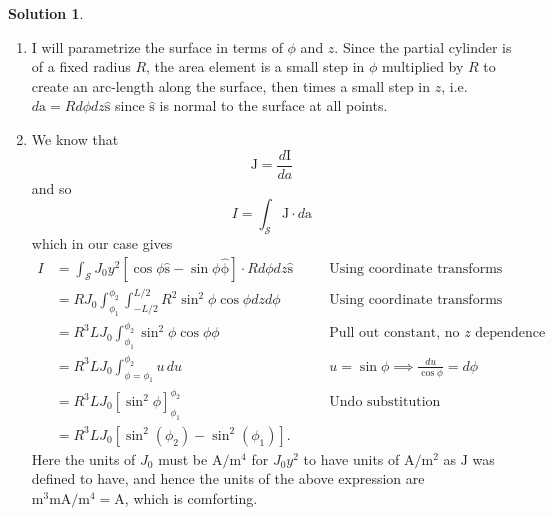 \documentclass[10pt]{article}
\theoremstyle{definition}
\newtheorem{soln}{Solution}
\newcommand{\uv}[1]{\hat{\bv{{#1}}}}
\newcommand{\justif}[2]{&{#1}&\text{#2}}
\newcommand{\bv}[1]{\bm{\mathrm{#1}}}
\begin{document}
\begin{soln}
\begin{enumerate}[label=(\alph*)]
\begin{center}
          \end{center}
    \item I will parametrize the surface in terms of $\phi$ and $z$. Since the partial cylinder is of a fixed radius $R$, the area element is a small step in $\phi$ multiplied by $R$
          to create an arc-length along the surface, then
          times a small step in $z$, i.e. $d\bv{a}=Rd\phi dz\uv{s}$ since $\uv{s}$ is normal to the surface at all points.
    \item We know that
          $$\bv{J}=\frac{d\bv{I}}{da}$$ and so
          $$I=\int_\mathcal{S}\bv{J}\cdot d\bv{a}$$
          which in our case gives
          \begin{align*}
            I & =\int_\mathcal{S}J_0y^2\left[\cos\phi\uv{s}-\sin\phi\uv{\phi}\right]\cdot Rd\phi dz\uv{s}\justif{\quad}{Using coordinate transforms} \\
              & =RJ_0\int_{\phi_1}^{\phi_2}\int_{-L/2}^{L/2}R^2\sin^2\phi\cos\phi dzd \phi\justif{\quad}{Using coordinate transforms}                \\
              & =  R^3LJ_0\int_{\phi_1}^{\phi_2}\sin^2\phi\cos\phi  \phi \justif{\quad}{Pull out constant, no $z$ dependence}                        \\
              & =  R^3LJ_0\int_{\phi=\phi_1}^{\phi_2}u\,d u\justif{\quad}{$u=\sin\phi\implies \frac{du}{\cos\phi}=d\phi$}                            \\
              & =  R^3LJ_0\left[\sin^2\phi\right]_{\phi_1}^{\phi_2}\justif{\quad}{Undo substitution}                                                 \\
              & =  R^3LJ_0\left[\sin^2(\phi_2)-\sin^2(\phi_1)\right].
          \end{align*}
          Here the units of $J_0$ must be $\unit{\ampere\per\meter\tothe 4}$ for $J_0y^2$ to have units of $\unit{\ampere\per\meter\squared}$ as $\bv{J}$ was defined to have,
          and hence the units of the above expression are $\unit{\meter\cubed\meter\ampere\per\meter\tothe 4}=\unit{\ampere}$, which is comforting.
  \end{enumerate}
\end{soln}
\end{document}

